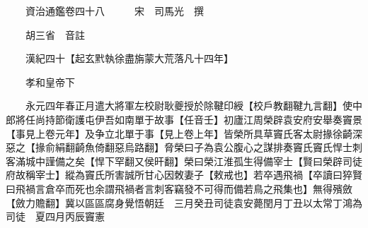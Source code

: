 










 


 
 


 

  
  
  
  
  





  
  
  
  
  
 
  

  

  
  
  



  

 
 

  
   




  

  
  


  　　資治通鑑卷四十八　　　宋　司馬光　撰

　　胡三省　音註

　　漢紀四十【起玄黓執徐盡旃蒙大荒落凡十四年】

　　孝和皇帝下

　　永元四年春正月遣大將軍左校尉耿夔授於除鞬印綬【校戶教翻鞬九言翻】使中郎將任尚持節衛護屯伊吾如南單于故事【任音壬】初廬江周榮辟袁安府安舉奏竇景【事見上卷元年】及争立北單于事【見上卷上年】皆榮所具草竇氏客太尉掾徐齮深惡之【掾俞絹翻齮魚倚翻惡烏路翻】脅榮曰子為袁公腹心之謀排奏竇氏竇氏悍士刺客滿城中謹備之矣【悍下罕翻又侯旰翻】榮曰榮江淮孤生得備宰士【賢曰榮辟司徒府故稱宰士】縱為竇氏所害誠所甘心因敇妻子【敕戒也】若卒遇飛禍【卒讀曰猝賢曰飛禍言倉卒而死也余謂飛禍者言刺客竊發不可得而備若鳥之飛集也】無得殯斂【斂力贍翻】冀以區區腐身覺悟朝廷　三月癸丑司徒袁安薨閏月丁丑以太常丁鴻為司徒　夏四月丙辰竇憲

